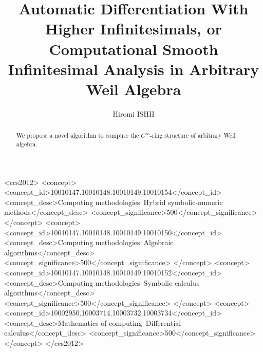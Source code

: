 \documentclass[%
  sigconf,authorversion,screen]{acmart}
\begin{document}
\title[Automatic Differentiation With Higher Infinitesimals]{Automatic Differentiation With Higher Infinitesimals, or Computational Smooth Infinitesimal Analysis in Arbitrary Weil Algebra}

\author{Hiromi ISHII}

\renewcommand{\shortauthors}{Hiromi ISHII}

\begin{abstract}
  We propose a novel algorithm to compute the $C^\infty$-ring structure of arbitrary Weil algebra.

\end{abstract}

\begin{CCSXML}
<ccs2012>
   <concept>
       <concept_id>10010147.10010148.10010149.10010154</concept_id>
       <concept_desc>Computing methodologies~Hybrid symbolic-numeric methods</concept_desc>
       <concept_significance>500</concept_significance>
       </concept>
   <concept>
       <concept_id>10010147.10010148.10010149.10010150</concept_id>
       <concept_desc>Computing methodologies~Algebraic algorithms</concept_desc>
       <concept_significance>500</concept_significance>
       </concept>
   <concept>
       <concept_id>10010147.10010148.10010149.10010152</concept_id>
       <concept_desc>Computing methodologies~Symbolic calculus algorithms</concept_desc>
       <concept_significance>500</concept_significance>
       </concept>
   <concept>
       <concept_id>10002950.10003714.10003732.10003734</concept_id>
       <concept_desc>Mathematics of computing~Differential calculus</concept_desc>
       <concept_significance>500</concept_significance>
       </concept>
 </ccs2012>
\end{CCSXML}



\end{document}
